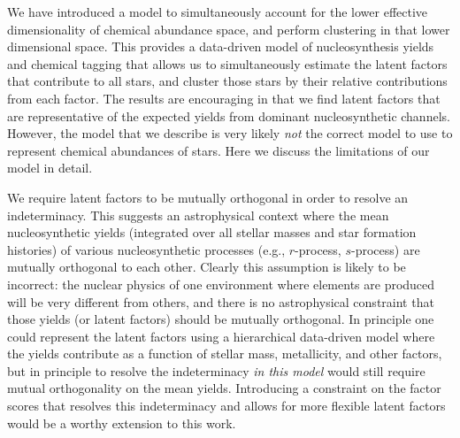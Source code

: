 \documentclass[twocolumn]{aastex62}
\begin{document}

We have introduced a model to simultaneously account for the lower
effective dimensionality of chemical abundance space, and perform clustering
in that lower dimensional space. This provides a data-driven model of
nucleosynthesis yields and chemical tagging that allows us to simultaneously
estimate the latent factors that contribute to all stars, and cluster those 
stars by their relative contributions from each factor. The results are
encouraging in that we find latent factors that are representative of the
expected yields from dominant nucleosynthetic channels. However, the model that
we describe is very likely \emph{not} the correct model to use to represent 
chemical abundances of stars. Here we discuss the limitations of our model 
in detail.


We require latent factors to be mutually orthogonal in order to resolve
an indeterminacy. This suggests an astrophysical context where 
the mean nucleosynthetic yields (integrated over all stellar masses and star
formation histories) of various nucleosynthetic processes (e.g., $r$-process, 
$s$-process) are mutually orthogonal to each other. Clearly this assumption 
is likely to be incorrect: the nuclear physics
of one environment where elements are produced will be very different from
others, and there is no astrophysical constraint that those
yields (or latent factors) should be mutually orthogonal.
In principle one could represent the latent factors using a hierarchical data-driven model where the yields contribute as a function of stellar mass, 
metallicity, and other factors, but in principle to resolve the indeterminacy
\emph{in this model} would still require mutual orthogonality on the mean yields. Introducing a constraint on the factor scores that resolves this indeterminacy and allows for more flexible latent factors would be a worthy extension to this work.
\end{document}

